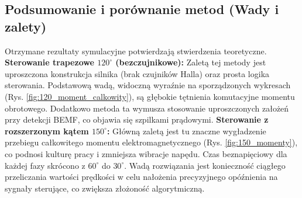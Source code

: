 \documentclass[12pt]{article}
\begin{document}
\subsection{Podsumowanie i porównanie metod (Wady i zalety)}
Otrzymane rezultaty symulacyjne potwierdzają stwierdzenia teoretyczne.
\textbf{Sterowanie trapezowe $120^{\circ}$ (bezczujnikowe):} Zaletą tej metody jest uproszczona konstrukcja silnika (brak czujników Halla) oraz prosta logika sterowania. Podstawową wadą, widoczną wyraźnie na sporządzonych wykresach (Rys. \ref{fig:120_moment_calkowity}), są głębokie tętnienia komutacyjne momentu obrotowego. Dodatkowo metoda ta wymusza stosowanie uproszczonych założeń przy detekcji BEMF, co objawia się szpilkami prądowymi.
\textbf{Sterowanie z rozszerzonym kątem $150^{\circ}$:} Główną zaletą jest tu znaczne wygładzenie przebiegu całkowitego momentu elektromagnetycznego (Rys. \ref{fig:150_momenty}), co podnosi kulturę pracy i zmniejsza wibracje napędu. Czas beznapięciowy dla każdej fazy skrócono z $60^{\circ}$ do $30^{\circ}$. Wadą rozwiązania jest konieczność ciągłego przeliczania wartości prędkości w celu nałożenia precyzyjnego opóźnienia na sygnały sterujące, co zwiększa złożoność algorytmiczną.
\end{document}

